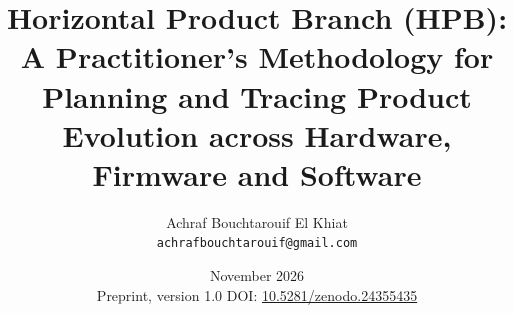 \title{Horizontal Product Branch (HPB): A Practitioner's Methodology for
  Planning and Tracing Product Evolution across Hardware, Firmware and
  Software}
\author{Achraf Bouchtarouif El Khiat\\\texttt{achrafbouchtarouif@gmail.com}}
\date{November 2026\\[4pt]\small Preprint, version 1.0\quad
  DOI: \href{https://doi.org/10.5281/zenodo.24355435}{10.5281/zenodo.24355435}}



\maketitle

\begin{abstract}

\end{abstract}


















\clearpage
\appendix






